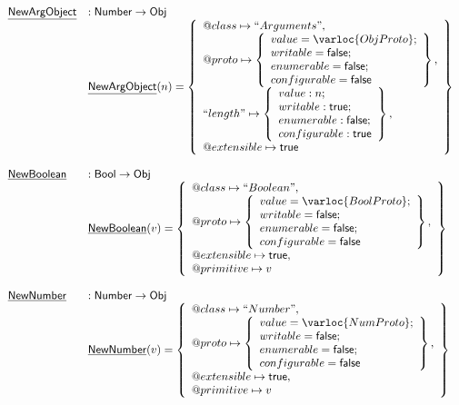 \[
\begin{array}{ll}

\chf{NewArgObject} & : \SF{Number} \rightarrow \SF{Obj} \\
& \chf{NewArgObject}(n) = \set{
    \varprop{class}\mapsto ``Arguments",\\
    \varprop{proto}\mapsto 
    \set{
      value=\varloc{ObjProto};\\writable=\vfalse;\\
      enumerable=\vfalse;\\configurable=\vfalse
    },\\
   ``length"\mapsto \set{
       value:n;\\
       writable:\vtrue;\\
       enumerable:\vfalse;\\
       configurable:\vtrue
     },\\
    \varprop{extensible}\mapsto \vtrue
}\\\\

\chf{NewBoolean} & : \SF{Bool} \rightarrow \SF{Obj} \\
& \chf{NewBoolean}(v) = \set{
    \varprop{class}\mapsto ``Boolean",\\
    \varprop{proto}\mapsto 
    \set{
      value=\varloc{BoolProto};\\writable=\vfalse;\\
      enumerable=\vfalse;\\configurable=\vfalse
    },\\
    \varprop{extensible}\mapsto \vtrue, \\
    \varprop{primitive}\mapsto v
}\\\\

\chf{NewNumber} & : \SF{Number} \rightarrow \SF{Obj} \\
& \chf{NewNumber}(v) = \set{
    \varprop{class}\mapsto ``Number",\\
    \varprop{proto}\mapsto 
    \set{
      value=\varloc{NumProto};\\writable=\vfalse;\\
      enumerable=\vfalse;\\configurable=\vfalse
    },\\
    \varprop{extensible}\mapsto \vtrue, \\
    \varprop{primitive}\mapsto v
}\\\\


\end{array}\]
